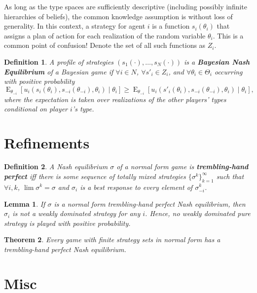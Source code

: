 \documentclass[letter, 11pt]{article}
\theoremstyle{basic}
\newtheorem{definition}{Definition}[section]
\newtheorem{theorem}{Theorem}[section]
\newtheorem{lemma}[theorem]{Lemma}
\newcommand{\E}{\operatorname{E}}
\begin{document}
\begin{spacing}{1.0}
As long as the type spaces are sufficiently descriptive (including possibly
infinite hierarchies of beliefs), the common knowledge assumption is
without loss of generality. In this context, a strategy for agent $i$ is a
function $s_i(\theta_i)$ that assigns a plan of action for each realization
of the random variable $\theta_i$. This is a common point of confusion!
Denote the set of all such functions as $Z_i$.

\begin{definition}
  A profile of strategies $(s_1(\cdot), \ldots, s_N(\cdot))$ is a
  \textbf{Bayesian Nash Equilibrium} of a Bayesian game if $\forall i \in N$, $\forall s'_i \in Z_i$, and $\forall \theta_i
  \in \Theta_i$ occurring with positive
  probability \[\E_{\theta_{-i}}\left[u_i(s_i(\theta_i), s_{-i}(\theta_{-i}),
    \theta_i) \;|\; \theta_i \right] \geq \E_{\theta_{-i}}\left[u_i(s'_i(\theta_i), s_{-i}(\theta_{-i}),
    \theta_i) \;|\; \theta_i \right], \] where the expectation is taken over
  realizations of the other players' types conditional on player $i$'s type.
\end{definition}

\section{Refinements}

\begin{definition}
  A Nash equilibrium $\sigma$ of a normal form game is
  \textbf{trembling-hand perfect} iff there is some sequence of totally
  mixed strategies $\{\sigma^k\}_{k=1}^\infty$ such that $\forall i,k$,
  $\lim \sigma^k = \sigma$ and $\sigma_i$ is a best response to every
  element of $\sigma_{-i}^k$.
\end{definition}

\begin{lemma}
  If $\sigma$ is a normal form trembling-hand perfect Nash equilibrium, then
  $\sigma_i$ is not a weakly dominated strategy for any $i$. Hence, no weakly
  dominated pure strategy is played with positive probability.
\end{lemma}

\begin{theorem}
  Every game with finite strategy sets in normal form has a trembling-hand
  perfect Nash equilibrium.
\end{theorem}

\section{Misc}


\end{spacing}
\end{document}
